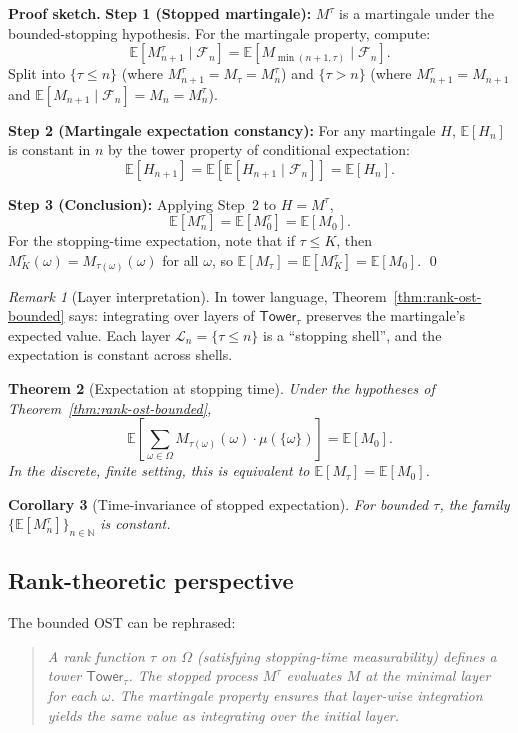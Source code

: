 \documentclass[11pt]{article}
\newtheorem{theorem}{Theorem}[section]
\newtheorem{corollary}[theorem]{Corollary}
\theoremstyle{definition}
\theoremstyle{remark}
\newtheorem{remark}[theorem]{Remark}
\newcommand{\layer}{\mathcal{L}}
\newcommand{\Tower}{\mathsf{Tower}}
\newcommand{\Filtration}{\mathcal{F}}
\newcommand{\NN}{\mathbb{N}}
\newcommand{\EE}{\mathbb{E}}
\begin{document}
\noindent\textbf{Proof sketch.}
\textbf{Step 1 (Stopped martingale):} $M^\tau$ is a martingale under the bounded-stopping hypothesis.
For the martingale property, compute:
\[
\EE[M^\tau_{n+1} \mid \Filtration_n] = \EE[M_{\min(n+1, \tau)} \mid \Filtration_n].
\]
Split into $\{\tau \leq n\}$ (where $M^\tau_{n+1} = M_\tau = M^\tau_n$) and $\{\tau > n\}$ (where $M^\tau_{n+1} = M_{n+1}$ and $\EE[M_{n+1} \mid \Filtration_n] = M_n = M^\tau_n$).

\textbf{Step 2 (Martingale expectation constancy):} For any martingale $H$, $\EE[H_n]$ is constant in $n$ by the tower property of conditional expectation:
\[
\EE[H_{n+1}] = \EE[\EE[H_{n+1} \mid \Filtration_n]] = \EE[H_n].
\]

\textbf{Step 3 (Conclusion):} Applying Step~2 to $H = M^\tau$,
\[
\EE[M^\tau_n] = \EE[M^\tau_0] = \EE[M_0].
\]
For the stopping-time expectation, note that if $\tau \leq K$, then $M^\tau_K(\omega) = M_{\tau(\omega)}(\omega)$ for all $\omega$, so $\EE[M_\tau] = \EE[M^\tau_K] = \EE[M_0]$.
\qed

\begin{remark}[Layer interpretation]
\label{rem:layer-interp}
In tower language, Theorem~\ref{thm:rank-ost-bounded} says: integrating over layers of $\Tower_\tau$ preserves the martingale's expected value.
Each layer $\layer_n = \{\tau \leq n\}$ is a ``stopping shell'', and the expectation is constant across shells.
\end{remark}

\begin{theorem}[Expectation at stopping time]
\label{thm:ost-at-tau}
Under the hypotheses of Theorem~\ref{thm:rank-ost-bounded},
\[
\EE\left[\sum_{\omega \in \Omega} M_{\tau(\omega)}(\omega) \cdot \mu(\{\omega\})\right] = \EE[M_0].
\]
In the discrete, finite setting, this is equivalent to $\EE[M_\tau] = \EE[M_0]$.
\end{theorem}

\begin{corollary}[Time-invariance of stopped expectation]
\label{cor:time-invariance}
For bounded $\tau$, the family $\{\EE[M^\tau_n]\}_{n \in \NN}$ is constant.
\end{corollary}

\subsection{Rank-theoretic perspective}

The bounded OST can be rephrased:
\begin{quote}
\emph{A rank function $\tau$ on $\Omega$ (satisfying stopping-time measurability) defines a tower $\Tower_\tau$.
The stopped process $M^\tau$ evaluates $M$ at the minimal layer for each $\omega$.
The martingale property ensures that layer-wise integration yields the same value as integrating over the initial layer.}
\end{quote}
\end{document}

